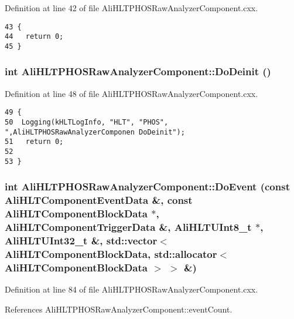 Definition at line 42 of file Ali\-HLTPHOSRaw\-Analyzer\-Component.cxx.

\footnotesize\begin{verbatim}43 {
44   return 0;
45 }
\end{verbatim}\normalsize 


\subsubsection{\setlength{\rightskip}{0pt plus 5cm}int Ali\-HLTPHOSRaw\-Analyzer\-Component::Do\-Deinit ()\hspace{0.3cm}{\tt  [virtual, inherited]}}\label{classAliHLTPHOSRawAnalyzerComponent_AliHLTPHOSRawAnalyzerPeakFinderComponenta8}




Definition at line 48 of file Ali\-HLTPHOSRaw\-Analyzer\-Component.cxx.

\footnotesize\begin{verbatim}49 {
50  Logging(kHLTLogInfo, "HLT", "PHOS", ",AliHLTPHOSRawAnalyzerComponen DoDeinit");
51   return 0;
52 
53 }
\end{verbatim}\normalsize 


\subsubsection{\setlength{\rightskip}{0pt plus 5cm}int Ali\-HLTPHOSRaw\-Analyzer\-Component::Do\-Event (const Ali\-HLTComponent\-Event\-Data \&, const Ali\-HLTComponent\-Block\-Data $\ast$, Ali\-HLTComponent\-Trigger\-Data \&, Ali\-HLTUInt8\_\-t $\ast$, Ali\-HLTUInt32\_\-t \&, std::vector$<$ Ali\-HLTComponent\-Block\-Data, std::allocator$<$ Ali\-HLTComponent\-Block\-Data $>$ $>$ \&)\hspace{0.3cm}{\tt  [virtual, inherited]}}\label{classAliHLTPHOSRawAnalyzerComponent_AliHLTPHOSRawAnalyzerPeakFinderComponenta12}




Definition at line 84 of file Ali\-HLTPHOSRaw\-Analyzer\-Component.cxx.

References Ali\-HLTPHOSRaw\-Analyzer\-Component::event\-Count.

